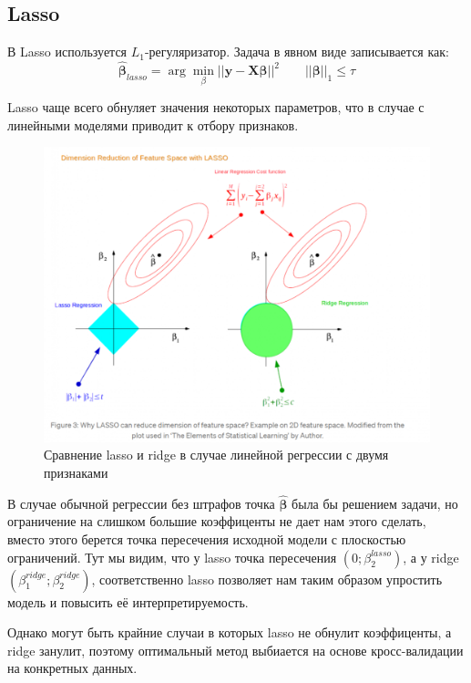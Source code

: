 \documentclass[12pt]{article}
\newcommand{\betah}{\hat{\bm \beta}}
\newcommand{\betaa}{\bm{\beta}}
\newcommand{\X}{\bm{X}}
\newcommand{\y}{\bm{y}}
\begin{document}
	\subsection{Lasso}
	В Lasso используется $L_1$-регуляризатор. Задача в явном виде записывается как:
	\begin{equation}\label{lassoTask1}
		\betah_{lasso} = \arg \min _{{\beta}} || \y - \X \betaa ||^2
		\qquad
		|| \betaa ||_1 \leq \tau
	\end{equation}		
	
	Lasso чаще всего обнуляет значения некоторых параметров, что в случае с линейными моделями приводит к отбору признаков.
	
	\newpage
	
	\begin{figure}[h!]
		\includegraphics[width=\linewidth]{img/1}
		\caption{Сравнение lasso и ridge в случае линейной регрессии с двумя признаками}
		\label{1}
	\end{figure}
	
	В случае обычной регрессии без штрафов точка $\betah$ была бы решением задачи, но ограничение на слишком большие коэффиценты не дает нам этого сделать, вместо этого берется точка пересечения исходной модели с плоскостью ограничений. Тут мы видим, что у lasso точка пересечения $(0; \beta_{2}^{lasso})$, а у ridge  $(\beta_{1}^{ridge}; \beta_{2}^{ridge})$, соответственно lasso позволяет нам таким образом упростить модель и повысить её интерпретируемость.
	
	Однако могут быть крайние случаи в которых lasso не обнулит коэффиценты, а ridge занулит, поэтому оптимальный метод выбиается на основе кросс-валидации на конкретных данных.
	
\end{document}
